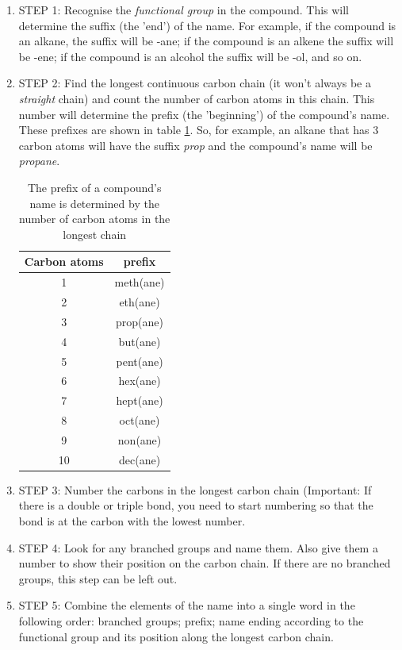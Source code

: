 \begin{enumerate}
\item{STEP 1: Recognise the \textit{functional group} in the compound. This will determine the suffix (the 'end') of the name. For example, if the compound is an alkane, the suffix will be -ane; if the compound is an alkene the suffix will be -ene; if the compound is an alcohol the suffix will be -ol, and so on.}
\item{STEP 2: Find the longest continuous carbon chain (it won't always be a \textit{straight} chain) and count the number of carbon atoms in this chain. This number will determine the prefix (the 'beginning') of the compound's name. These prefixes are shown in table \ref{tab:prefix}. So, for example, an alkane that has 3 carbon atoms will have the suffix \textit{prop} and the compound's name will be \textit{propane}.

\begin{table}[!h]
\begin{center}
\begin{tabular}{|c|c|}\hline
\textbf{Carbon atoms} & prefix \\\hline

1 & meth(ane)\\\hline
2 & eth(ane)\\\hline
3 & prop(ane)\\\hline
4 & but(ane) \\\hline
5 & pent(ane) \\\hline
6 & hex(ane) \\\hline
7 & hept(ane) \\\hline
8 & oct(ane) \\\hline
9 & non(ane) \\\hline
10 & dec(ane) \\\hline
\end{tabular}
\end{center}
\caption{The prefix of a compound's name is determined by the number of carbon atoms in the longest chain}
\label{tab:prefix}
\end{table}
}
\item{STEP 3: Number the carbons in the longest carbon chain (Important: If there is a double or triple bond, you need to start numbering so that the bond is at the carbon with the lowest number.}
\item{STEP 4: Look for any branched groups and name them. Also give them a number to show their position on the carbon chain. If there are no branched groups, this step can be left out.}
\item{STEP 5: Combine the elements of the name into a single word in the following order: branched groups; prefix; name ending according to the functional group and its position along the longest carbon chain.}
\end{enumerate}
